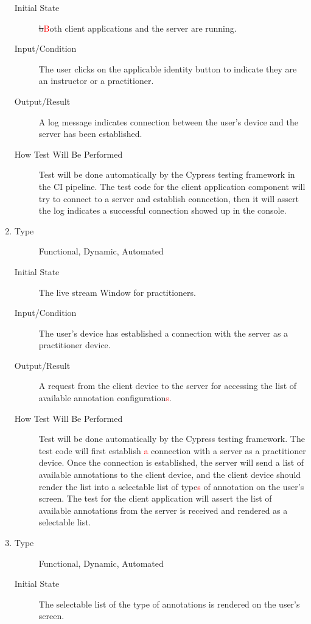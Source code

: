 \documentclass[12pt, titlepage]{article}
\newcommand{\rt}[1]{\textcolor{red}{#1}}
\begin{document}
\begin{enumerate}[FR-T1]
\begin{description}
  \item[Initial State] \sout{b}\rt{B}oth client applications and the server are running.
  \item[Input/Condition] The user clicks on the applicable identity button to
    indicate they are an instructor or a practitioner.
  \item[Output/Result] A log message indicates connection between the user’s device
    and the server has been established.
  \item[How Test Will Be Performed] Test will be done automatically by the Cypress
    testing framework in the CI pipeline. The test code for the client
    application component will try to connect to a server and establish
    connection, then it will assert the log indicates a successful connection
    showed up in the console.
  \end{description}
\item \label{FRT4}
  \begin{description}
  \item[Type] Functional, Dynamic, Automated
  \item[Initial State] The live stream Window for practitioners.
  \item[Input/Condition] The user’s device has established a connection with the
    server as a practitioner device.
  \item[Output/Result] A request from the client device to the server for accessing
    the list of available annotation configuration\rt{s}.
  \item[How Test Will Be Performed] Test will be done automatically by the Cypress
    testing framework. The test code will first establish \rt{a} connection with a
    server as a practitioner device. Once the connection is established, the
    server will send a list of available annotations to the client device, and
    the client device should render the list into a selectable list of type\rt{s} of
    annotation on the user's screen. The test for the client application will
    assert the list of available annotations from the server is received and
    rendered as a selectable list.
  \end{description}
\item \label{FRT5}
  \begin{description}
  \item[Type] Functional, Dynamic, Automated
  \item[Initial State] The selectable list of the type of annotations is
    rendered on the user's screen.

\end{description}
\end{enumerate}
\end{document}
